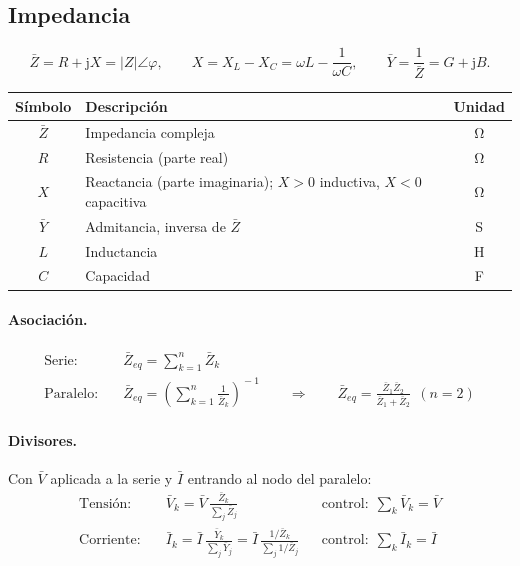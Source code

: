 \documentclass[11pt,a4paper]{article}
\newcommand{\ju}{\mathrm{j}}
\begin{document}
\subsection{Impedancia}

\[
  \bar{Z} = R + \ju X = |Z|\angle\varphi,
  \qquad
  X = X_L - X_C = \omega L - \frac{1}{\omega C},
  \qquad
  \bar{Y} = \frac{1}{\bar{Z}} = G + \ju B .
\]

\begin{table}[h]
\centering
\begin{tabular}{@{}cL{7.6cm}c@{}}
\toprule
\textbf{Símbolo} & \textbf{Descripción} & \textbf{Unidad} \\
\midrule
$\bar{Z}$ & Impedancia compleja & \unit{\ohm} \\
$R$       & Resistencia (parte real) & \unit{\ohm} \\
$X$       & Reactancia (parte imaginaria); $X>0$ inductiva, $X<0$ capacitiva & \unit{\ohm} \\
$\bar{Y}$ & Admitancia, inversa de $\bar{Z}$ & \unit{\siemens} \\
$L$       & Inductancia & \unit{\henry} \\
$C$       & Capacidad & \unit{\farad} \\
\bottomrule
\end{tabular}
\end{table}

\paragraph{Asociación.}
\begin{align}
  \text{Serie:}&\quad \bar{Z}_{eq} = \sum_{k=1}^{n} \bar{Z}_k \\
  \text{Paralelo:}&\quad \bar{Z}_{eq} = \left(\sum_{k=1}^{n} \frac{1}{\bar{Z}_k}\right)^{\!-1}
  \qquad\Longrightarrow\qquad
  \bar{Z}_{eq} = \frac{\bar{Z}_1\bar{Z}_2}{\bar{Z}_1+\bar{Z}_2} \ \ (n=2)
\end{align}

\paragraph{Divisores.} Con $\bar{V}$ aplicada a la serie y $\bar{I}$ entrando al nodo del paralelo:
\begin{align}
  \text{Tensión:}&\quad \bar{V}_k = \bar{V}\,\frac{\bar{Z}_k}{\displaystyle\sum_j \bar{Z}_j}
  &&\text{control:}\ \ \sum_k \bar{V}_k = \bar{V} \\[2mm]
  \text{Corriente:}&\quad \bar{I}_k = \bar{I}\,\frac{\bar{Y}_k}{\displaystyle\sum_j \bar{Y}_j}
                       = \bar{I}\,\frac{1/\bar{Z}_k}{\displaystyle\sum_j 1/\bar{Z}_j}
  &&\text{control:}\ \ \sum_k \bar{I}_k = \bar{I}
\end{align}
\end{document}
